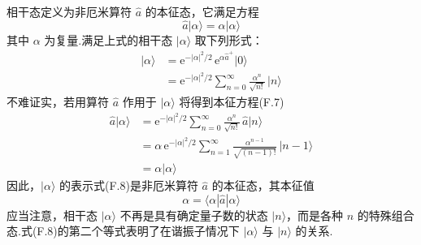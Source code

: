 相干态定义为非厄米算符 $\hat{a}$ 的本征态，它满足方程
\begin{equation}
  \hat{a}|\alpha\rangle=\alpha|\alpha\rangle
\end{equation}
其中 $\alpha$ 为复量.满足上式的相干态 $|\alpha\rangle$ 取下列形式：
\begin{equation}
\begin{aligned}
  |\alpha\rangle
  &=\mathrm{e}^{-|\alpha|^{2}/2}\,
  \mathrm{e}^{\alpha\hat{a}^{+}}|0\rangle\\
  &=\mathrm{e}^{-|\alpha|^{2}/2}\sum_{n=0}^{\infty}
  \frac{\alpha^{n}}{\sqrt{n!}}\,|n\rangle
\end{aligned}
\end{equation}
不难证实，若用算符 $\hat{a}$ 作用于 $|\alpha\rangle$ 将得到本征方程(F.7)
\begin{equation*}
\begin{aligned}
  \hat{a}|\alpha\rangle
  &=\mathrm{e}^{-|\alpha|^{2}/2}\sum_{n=0}^{\infty}
  \frac{\alpha^{n}}{\sqrt{n!}}\,\hat{a}|n\rangle\\
  &=\alpha\,\mathrm{e}^{-|\alpha|^{2}/2}\sum_{n=1}^{\infty}
  \frac{\alpha^{n-1}}{\sqrt{(n-1)!}}\,|n-1\rangle\\
  &=\alpha|\alpha\rangle
\end{aligned}
\end{equation*}
因此，$|\alpha\rangle$ 的表示式(F.8)是非厄米算符 $\hat{a}$ 的本征态，其本征值
\begin{equation}
  \alpha=\langle\alpha|\hat{a}|\alpha\rangle
\end{equation}
应当注意，相干态 $|\alpha\rangle$ 不再是具有确定量子数的状态 $|n\rangle$，而是各种 $n$ 的特殊组合态.式(F.8)的第二个等式表明了在谐振子情况下 $|\alpha\rangle$ 与 $|n\rangle$ 的关系.

